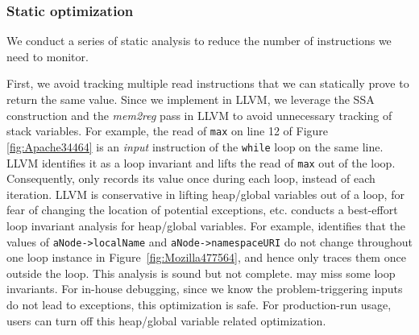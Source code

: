 



\subsubsection{Static optimization}
\label{sec:perf}

We conduct a series of static analysis to reduce the number of instructions we 
need to monitor. 

First, we avoid tracking multiple read instructions that we can statically 
prove to return the same value.
Since we implement \Tool in LLVM, we leverage the SSA construction and the
\textit{mem2reg} pass in LLVM to avoid unnecessary tracking of
stack variables.
For example, the read of \texttt{max} on line 12 of 
Figure \ref{fig:Apache34464} is an \textit{input} instruction of the 
\texttt{while} loop on the same line. LLVM identifies it as a loop invariant
and lifts the read of \texttt{max}
out of the loop. Consequently, \Tool only records
its value once during each loop, instead of each iteration.
LLVM is conservative in lifting heap/global variables out of
a loop, for fear of changing the location of potential exceptions, etc.
\Tool conducts a best-effort
loop invariant analysis for heap/global variables.
For example, \Tool identifies that the values of
\texttt{aNode->localName} and \texttt{aNode->namespaceURI} do not change
throughout one loop instance
in Figure~\ref{fig:Mozilla477564}, and hence only traces them once
outside the loop. This analysis is sound but not complete.
\Tool may miss some loop invariants. For in-house debugging, since we know
the problem-triggering inputs do not lead to exceptions, this optimization
is safe. For production-run usage, users can turn off this heap/global
variable related optimization.

